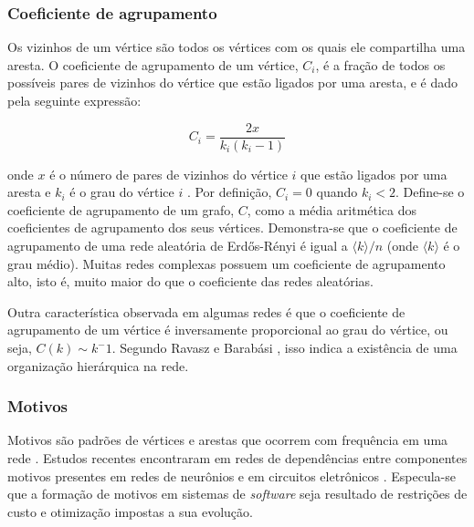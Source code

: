 \documentclass{article}
\begin{document}


\subsubsection{Coeficiente de agrupamento}

Os vizinhos de um vértice são todos os vértices com os quais ele compartilha uma aresta. O coeficiente de agrupamento de um vértice, $C_i$, é a fração de todos os possíveis pares de vizinhos do vértice que estão ligados por uma aresta, e é dado pela seguinte expressão:

\[  C_i = \frac{2x}{k_i(k_i - 1)} \]

onde $x$ é o número de pares de vizinhos do vértice $i$ que estão ligados por uma aresta e $k_i$ é o grau do vértice $i$ \cite{Watts1998}. Por definição, $C_i = 0$ quando $k_i < 2$. Define-se o coeficiente de agrupamento de um grafo, $C$, como a média aritmética dos coeficientes de agrupamento dos seus vértices. Demonstra-se que o coeficiente de agrupamento de uma rede aleatória de Erdős-Rényi é igual a $\langle k \rangle / n$ (onde $\langle k \rangle$ é o grau médio). Muitas redes complexas possuem um coeficiente de agrupamento alto, isto é, muito maior do que o coeficiente das redes aleatórias.

Outra característica observada em algumas redes é que o coeficiente de agrupamento de um vértice é inversamente proporcional ao grau do vértice, ou seja, $C(k) \sim k^-1$. Segundo Ravasz e Barabási \cite{Ravasz2003}, isso indica a existência de uma organização hierárquica na rede.

\subsubsection{Motivos}

Motivos são padrões de vértices e arestas que ocorrem com frequência em uma rede \cite{Milo2002}. Estudos recentes encontraram em redes de dependências entre componentes motivos presentes em redes de neurônios e em circuitos eletrônicos \cite{Valverde2005,Ma2008}. Especula-se que a formação de motivos em sistemas de \textit{software} seja resultado de restrições de custo e otimização impostas a sua evolução.
\end{document}
